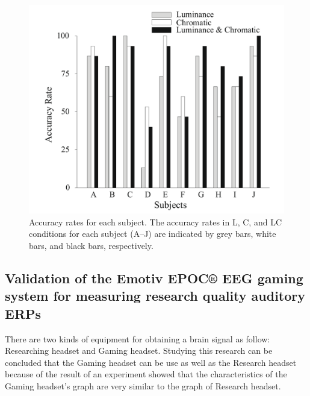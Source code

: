 \begin{figure}[ht]
	\centering
  	\includegraphics[scale = 0.5]{chapter2/23.pdf}
  	\caption{Accuracy rates for each subject. The accuracy rates in L, C, and LC conditions for each subject (A–J) are indicated by grey bars, white bars, and black bars, respectively.}
\end{figure}

\newpage
\subsection {Validation of the Emotiv EPOC® EEG gaming system for measuring research quality auditory ERPs\cite{ref4}}
\hspace{1.5cm} There are two kinds of equipment for obtaining a brain signal as follow: Researching headset and Gaming headset. Studying this research can be concluded that the Gaming headset can be use as well as the Research headset because of the result of an experiment showed that the characteristics of the Gaming headset's graph are very similar to the graph of Research headset.

